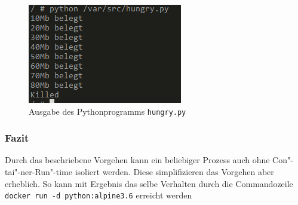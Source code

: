 \begin{figure}[hp]
	 \begin{center}
	 	\includegraphics[scale=1.3]{bilder/cgroup-container-killed.png}
	 	\caption{Ausgabe des Pythonprogramms \texttt{hungry.py}}
	 	\label{fig:cgroupKilled}
	 \end{center}
\end{figure}

\subsubsection{Fazit}
\label{sec:eigImplFazit}

Durch das beschriebene Vorgehen kann ein beliebiger Prozess auch ohne Con"-tai"-ner-Run"-time isoliert werden. Diese simplifizieren das Vorgehen aber erheblich. So kann mit Ergebnis das selbe Verhalten durch die Commandozeile \texttt{docker run -d python:alpine3.6} erreicht werden